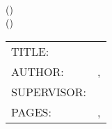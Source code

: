 \noindent
\thesisInstitution{} \\
\thesisTargetDegreeName{} (\thesisSubmissionYear{}) \\
\thesisCityProvince{} (\thesisInstitutionDepartment{})

\vspace{2cm}

\noindent
\begin{flushleft}
\begin{tabular}{@{}ll}
    TITLE:      & \thesisTitle{}                                                  \\
    AUTHOR:     & \thesisAuthorName{}, \thesisAuthorCredentials{}                 \\
    SUPERVISOR: & \thesisSupervisor{}                                             \\
    PAGES:      & \pageref{\thesisLastPageOfFrontMatterLabel}, \pageref{LastPage}
\end{tabular}
\end{flushleft}
